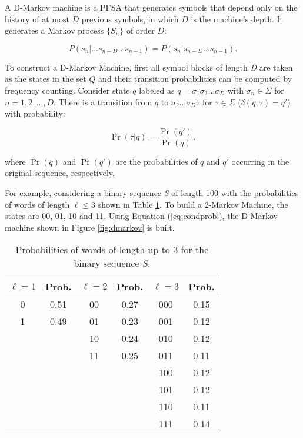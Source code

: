 {A D-Markov machine is a PFSA that generates symbols that depend only on the history of at most $D$ previous symbols, in which $D$ is the machine's depth. It generates a Markov process $\{S_n\}$ of order $D$:

\[
P(s_n|\ldots s_{n-D}\ldots s_{n-1}) = P(s_n|s_{n-D}\ldots s_{n-1}).
\]

\noindent To construct a D-Markov Machine, first all symbol blocks of length \textit{D} are taken as the states in the set $Q$ and their transition probabilities can be computed by frequency counting. Consider state $q$ labeled as $q = \sigma_1\sigma_2\ldots\sigma_{D}$ with $\sigma_n\in\Sigma$ for $n = 1,2,\ldots,D$. There is a transition from $q$ to $\sigma_2\ldots\sigma_{D}\tau$ for $\tau\in\Sigma$ ($\delta(q,\tau) = q'$) with probability:

\begin{equation}\label{eq:condprob}
\Pr(\tau | q) = \frac{\Pr(q')}{\Pr(q)},
\end{equation}

\noindent where $\Pr(q)$ and $\Pr(q')$ are the probabilities of $q$ and $q'$ occurring in the original sequence, respectively.

For example, considering a binary sequence \textit{S} of length 100 with the probabilities of words of length $\ell \leq 3$ shown in Table \ref{tab:subseq}. To build a 2-Markov Machine, the states are 00, 01, 10 and 11.  Using Equation (\ref{eq:condprob}), the D-Markov machine shown in Figure \ref{fig:dmarkov} is built.

\begin{table}
\centering
\caption{Probabilities of words of length up to 3 for the binary sequence \textit{S}. \label{tab:subseq}}
\begin{tabular}{|c|c|c|c|c|c|}
\hline
$\ell = 1$ & Prob. & $\ell = 2$ & Prob. & $\ell = 3$ & Prob. \\
\hline
0 & 0.51 & 00 & 0.27 & 000 & 0.15\\
1 & 0.49 & 01 & 0.23 & 001 & 0.12\\
  &      & 10 & 0.24 & 010 & 0.12\\
  &      & 11 & 0.25 & 011 & 0.11\\
  &	     &    &      & 100 & 0.12\\
  &      &    &      & 101 & 0.12\\
  &      &    &      & 110 & 0.11\\
  &      &    &      & 111 & 0.14\\
\hline
\end{tabular}
\end{table}

}
